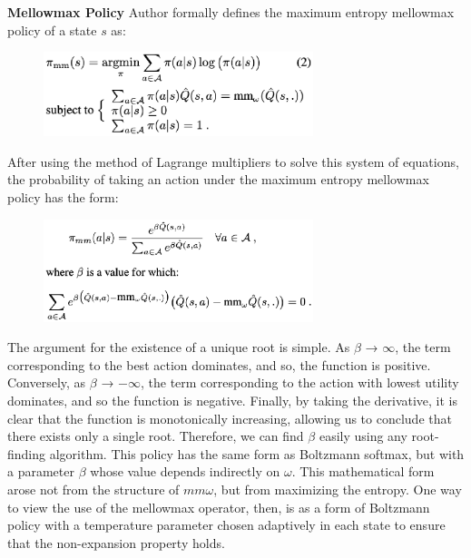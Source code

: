 \textbf{Mellowmax Policy}
\newline\newline
Author formally defines the maximum entropy mellowmax policy of a state $s$ as:
\begin{figure}[H] %
\centering %
\includegraphics[width=0.7\textwidth]{entropy.eps} %
\end{figure}

After using the method of Lagrange multipliers to solve this system of equations, the probability of taking an action under the maximum entropy mellowmax policy has the form:
\begin{figure}[H] %
\centering %
\includegraphics[width=0.7\textwidth]{result.eps} %
\end{figure}

The argument for the existence of a unique root is simple. As $\beta$ → $\infty$, the term corresponding to the best action dominates, and so, the function is positive. Conversely, as $\beta$ → $-\infty$, the term corresponding to the action with lowest utility dominates, and so the function is negative. Finally, by taking the derivative, it is clear that the function is monotonically increasing, allowing us to conclude that there exists only a single root. Therefore, we can find $\beta$ easily using any root-finding algorithm. 
\newline\newline
This policy has the same form as Boltzmann softmax, but with a parameter $\beta$ whose value depends indirectly on $\omega$. This mathematical form arose not from the structure of $mm\omega$, but from maximizing the entropy. One way to view the use of the mellowmax operator, then, is as a form of Boltzmann policy with a temperature parameter chosen adaptively in each state to ensure that the non-expansion property holds.
